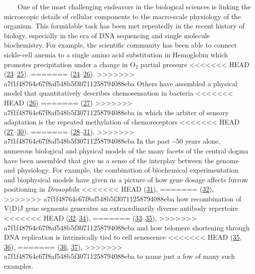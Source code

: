 ~~~~One
of the
most
challenging
endeavors
in the
biological
sciences
is
linking
the
microscopic
details
of
cellular
components
to the
macro-scale
physiology
of the
organism.
This
formidable
task
has
been
met
repeatedly
in the
recent
history
of
biology,
especially
in the
era of
DNA
sequencing
and
single
molecule
biochemistry.
For
example,
the
scientific
community
has
been
able
to
connect
sickle-cell
anemia
to a
single
amino
acid
substitution
in
Hemoglobin
which
promotes
precipitation
under
a
change
in
O\(_2\)
partial
pressure
<<<<<<< HEAD
(\protect\hyperlink{ref-feeling-taylor2004}{23}--\protect\hyperlink{ref-perutz1950}{25}).
=======
(\protect\hyperlink{ref-feeling-taylor2004}{24}--\protect\hyperlink{ref-perutz1950}{26}).
>>>>>>> a7f1f48764c67f8af548b5f30711258794088eba
Others
have
assembled
a
physical
model
that
quantitatively
describes
chemosensation
in
bacteria
<<<<<<< HEAD
(\protect\hyperlink{ref-berg1977}{26})
=======
(\protect\hyperlink{ref-berg1977}{27})
>>>>>>> a7f1f48764c67f8af548b5f30711258794088eba
in
which
the
arbiter
of
sensory
adaptation
is the
repeated
methylation
of
chemoreceptors
<<<<<<< HEAD
(\protect\hyperlink{ref-colin2017}{27}--\protect\hyperlink{ref-sourjik2002}{30}).
=======
(\protect\hyperlink{ref-colin2017}{28}--\protect\hyperlink{ref-sourjik2002}{31}).
>>>>>>> a7f1f48764c67f8af548b5f30711258794088eba
In the
past
\textasciitilde{}50
years
alone,
numerous
biological
and
physical
models
of the
many
facets
of the
central
dogma
have
been
assembled
that
give
us a
sense
of the
interplay
between
the
genome
and
physiology.
For
example,
the
combination
of
biochemical
experimentation
and
biophysical
models
have
given
us a
picture
of how
gene
dosage
affects
furrow
positioning
in
\emph{Drosophila}
<<<<<<< HEAD
(\protect\hyperlink{ref-liu2013}{31}),
=======
(\protect\hyperlink{ref-liu2013}{32}),
>>>>>>> a7f1f48764c67f8af548b5f30711258794088eba
how
recombination
of
V(D)J
gene
segments
generates
an
extraordinarily
diverse
antibody
repertoire
<<<<<<< HEAD
(\protect\hyperlink{ref-lovely2015}{32}--\protect\hyperlink{ref-schatz2011}{34}),
=======
(\protect\hyperlink{ref-lovely2015}{33}--\protect\hyperlink{ref-schatz2011}{35}),
>>>>>>> a7f1f48764c67f8af548b5f30711258794088eba
and
how
telomere
shortening
through
DNA
replication
is
intrinsically
tied
to
cell
senescence
<<<<<<< HEAD
(\protect\hyperlink{ref-herbig2004}{35},
\protect\hyperlink{ref-victorelli2017}{36}),
=======
(\protect\hyperlink{ref-herbig2004}{36},
\protect\hyperlink{ref-victorelli2017}{37}),
>>>>>>> a7f1f48764c67f8af548b5f30711258794088eba
to
name
just a
few of
many
such
examples.

